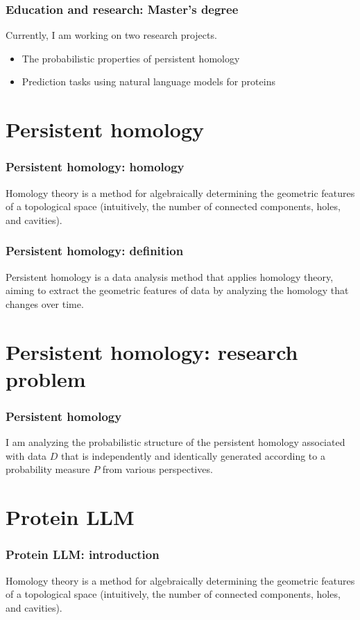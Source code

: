\documentclass[dvipdfmx,11pt,notheorems]{beamer}
\begin{document}
\begin{frame}\frametitle{Education and research: Master's degree}
  Currently, I am working on two research projects.

  \begin{itemize}
    \item The probabilistic properties of persistent homology
    \item Prediction tasks using natural language models for proteins
  \end{itemize}
\end{frame}

\section{Persistent homology}
\begin{frame}\frametitle{Persistent homology: homology}
  Homology theory is a method for algebraically determining the geometric features of a topological space (intuitively, the number of connected components, holes, and cavities).
\end{frame}

\begin{frame}\frametitle{Persistent homology: definition}
  Persistent homology is a data analysis method that applies homology theory, aiming to extract the geometric features of data by analyzing the homology that changes over time.
\end{frame}

\section{Persistent homology: research problem}
\begin{frame}\frametitle{Persistent homology}
  I am analyzing the probabilistic structure of the persistent homology associated with data $D$ that is independently and identically generated according to a probability measure $P$ from various perspectives.
\end{frame}

\section{Protein LLM}
\begin{frame}\frametitle{Protein LLM: introduction}
  \alert{Homology theory} is a method for algebraically determining the geometric features of a topological space (intuitively, the number of connected components, holes, and cavities).
\end{frame}
\end{document}
